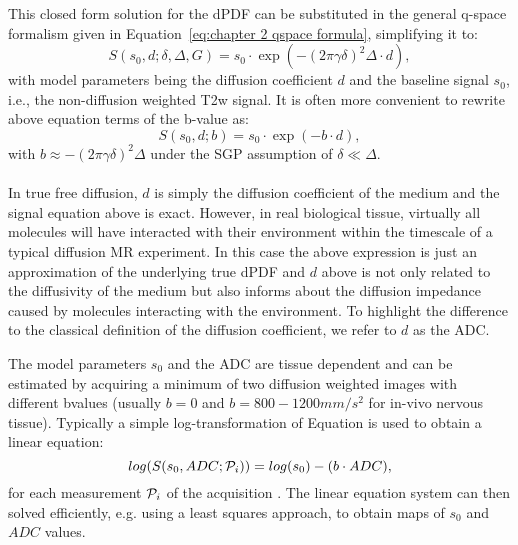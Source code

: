This closed form solution for the dPDF can be substituted in the general q-space formalism given in Equation~\ref{eq:chapter 2 qspace formula}, simplifying it to:
\begin{equation}
	S(s_0,d;\delta,\Delta,G) = s_0 \cdot \exp(-(2\pi\gamma\delta)^2\Delta \cdot d),
\end{equation}
with model parameters being the diffusion coefficient $d$ and the baseline signal $s_0$, i.e., the non-diffusion weighted T2w signal. It is often more convenient to rewrite above equation terms of the b-value as: 
\begin{equation}
	S(s_0,d;b) = s_0 \cdot \exp(-b \cdot d),
\end{equation}
with $b  \approx -(2\pi\gamma\delta)^2\Delta$ under the \gls{SGP} assumption of $\delta \ll \Delta$.
\paragraph{}
In true free diffusion, $d$ is simply the diffusion coefficient of the medium and the signal equation above is exact. However, in real biological tissue, virtually all molecules will have interacted with their environment within the timescale of a typical diffusion MR experiment. In this case the above expression is just an approximation of the underlying true dPDF and $d$ above is not only related to the diffusivity of the medium but also informs about the diffusion impedance caused by molecules interacting with the environment. To highlight the difference to the classical definition of the diffusion coefficient, we refer to $d$ as the \gls{ADC}.

The model parameters $s_0$ and the \gls{ADC} are tissue dependent and can be estimated by acquiring a minimum of two diffusion weighted images with different {\glspl{bvalue}} (usually $b=0$ and $b=800-1200mm/s^2$ for in-vivo nervous tissue). Typically a simple log-transformation of Equation \label{eq:chapter 2 adc} is used to obtain a linear equation:
\begin{equation}
	log(S(s_0,ADC;\mathcal{P}_i)) = log(s_{0}) - (b\cdot ADC),
    \label{eq:chapter 2 adc}
\end{equation}
for each measurement $\mathcal{P}_i$ of the acquisition \prot{}. The linear equation system can then solved efficiently, e.g. using a least squares approach, to obtain maps of $s_0$ and $ADC$ values.

